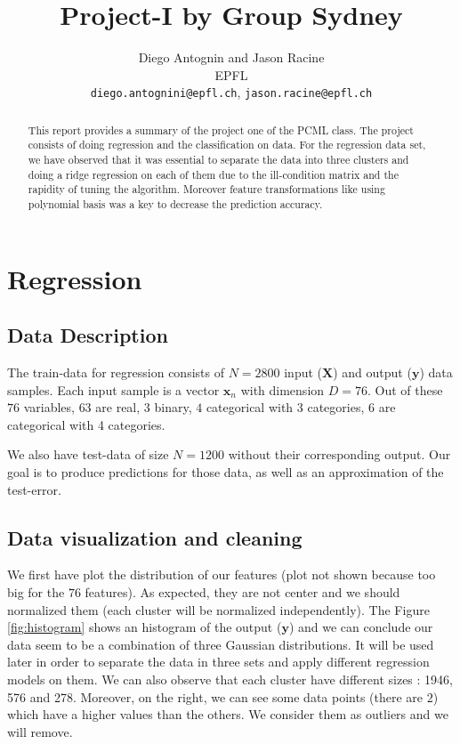 \documentclass{article} %
\title{Project-I by Group Sydney}
\author{
Diego Antognin and Jason Racine \\
EPFL \\
\texttt{diego.antognini@epfl.ch}, \texttt{jason.racine@epfl.ch} \\
}
\begin{document}
\maketitle

\begin{abstract}
This report provides a summary of the project one of the PCML class. The project consists of doing regression and the classification on data. For the regression data set, we have observed that it was essential to separate the data into three clusters and doing a ridge regression on each of them due to the ill-condition matrix and the rapidity of tuning the algorithm. Moreover feature transformations like using polynomial basis was a key to decrease the prediction accuracy.
\end{abstract}

\section{Regression}

\subsection{Data Description}

The train-data for regression consists of $N = 2800$ input ($\mathbf{X}$) and output ($\mathbf{y}$) data samples. Each input sample is a vector $\mathbf{x}_n$ with dimension $D = 76$. Out of these $76$ variables, $63$ are real, $3$ binary, $4$ categorical with 3 categories, $6$ are categorical with 4 categories.

We also have test-data of size $N=1200$ without their corresponding output. Our goal is to produce predictions for those data, as well as an approximation of the test-error.

\subsection{Data visualization and cleaning}

We first have plot the distribution of our features (plot not shown because too big for the $76$ features). As expected, they are not center and we should normalized them (each cluster will be normalized independently). The Figure \ref{fig:histogram} shows an histogram of the output ($\mathbf{y}$) and we can conclude our data  seem to be a combination of three Gaussian distributions. It will be used later in order to separate the data in three sets and apply different regression models on them. We can also observe that each cluster have different sizes : 1946, 576 and 278. Moreover, on the right, we can see some data points (there are $2$) which have a higher values than the others. We consider them as outliers and we will remove.
\end{document}
